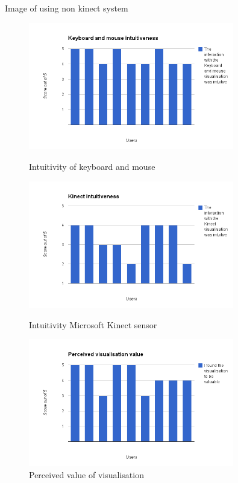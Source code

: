 Image of using non kinect system
\begin{figure}[h!]
  \centering
      \includegraphics[width=0.8\textwidth]{images/charts/chart_1.png}
  \caption{Intuitivity of keyboard and mouse}  
    \label{fig:chart1}
      \includegraphics[width=0.8\textwidth]{images/charts/chart_2.png}
  \caption{Intuitivity Microsoft Kinect sensor}  
    \label{fig:chart2}
      \includegraphics[width=0.8\textwidth]{images/charts/chart_3.png}
  \caption{Perceived value of visualisation}  
    \label{fig:chart3}
\end{figure}

